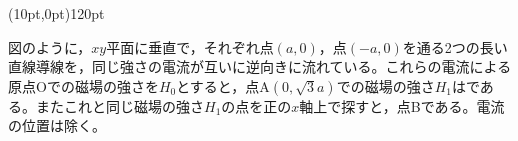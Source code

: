 \hakosyokika
\item
    \begin{mawarikomi}(10pt,0pt){120pt}{
        
    }
    図のように，$xy$平面に垂直で，それぞれ点$(a,0)$，点$(-a,0)$を通る2つの長い直線導線を，同じ強さの電流が互いに逆向きに流れている。これらの電流による原点Oでの磁場の強さを$H_0$とすると，点A$(0,\sqrt{3}a)$での磁場の強さ$H_1$は\Hako である。またこれと同じ磁場の強さ$H_1$の点を正の$x$軸上で探すと，点B\Hako である。電流の位置は除く。
    \end{mawarikomi}